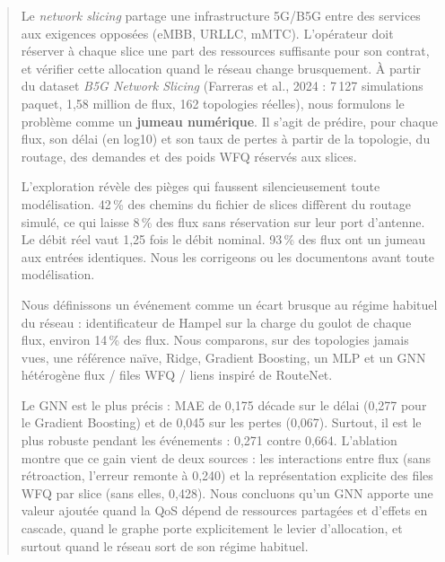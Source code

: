 \begin{abstract}
\noindent Le \emph{network slicing} partage une infrastructure 5G/B5G entre des services aux exigences opposées (eMBB, URLLC, mMTC). L'opérateur doit réserver à chaque slice une part des ressources suffisante pour son contrat, et vérifier cette allocation quand le réseau change brusquement. À partir du dataset \emph{B5G Network Slicing} (Farreras et al., 2024 : 7\,127 simulations paquet, 1,58 million de flux, 162 topologies réelles), nous formulons le problème comme un \textbf{jumeau numérique}. Il s'agit de prédire, pour chaque flux, son délai (en log10) et son taux de pertes à partir de la topologie, du routage, des demandes et des poids WFQ réservés aux slices.

L'exploration révèle des pièges qui faussent silencieusement toute modélisation. 42\,\% des chemins du fichier de slices diffèrent du routage simulé, ce qui laisse 8\,\% des flux sans réservation sur leur port d'antenne. Le débit réel vaut 1,25 fois le débit nominal. 93\,\% des flux ont un jumeau aux entrées identiques. Nous les corrigeons ou les documentons avant toute modélisation.

Nous définissons un événement comme un écart brusque au régime habituel du réseau : identificateur de Hampel sur la charge du goulot de chaque flux, environ 14\,\% des flux. Nous comparons, sur des topologies jamais vues, une référence naïve, Ridge, Gradient Boosting, un MLP et un GNN hétérogène flux / files WFQ / liens inspiré de RouteNet.

Le GNN est le plus précis : MAE de 0,175 décade sur le délai (0,277 pour le Gradient Boosting) et de 0,045 sur les pertes (0,067). Surtout, il est le plus robuste pendant les événements : 0,271 contre 0,664. L'ablation montre que ce gain vient de deux sources : les interactions entre flux (sans rétroaction, l'erreur remonte à 0,240) et la représentation explicite des files WFQ par slice (sans elles, 0,428). Nous concluons qu'un GNN apporte une valeur ajoutée quand la QoS dépend de ressources partagées et d'effets en cascade, quand le graphe porte explicitement le levier d'allocation, et surtout quand le réseau sort de son régime habituel.
\end{abstract}
